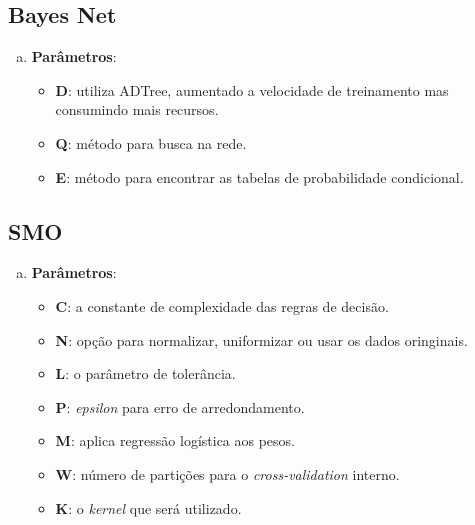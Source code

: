 \subsection{Bayes Net}

\begin{enumerate}[a)]
    \item \textbf{Parâmetros}:
        \begin{itemize}

            \item \textbf{D}: utiliza ADTree, aumentado a velocidade de treinamento mas consumindo mais recursos.

            \item \textbf{Q}: método para busca na rede.

            \item \textbf{E}: método para encontrar as tabelas de probabilidade condicional.
        \end{itemize}
\end{enumerate}

\subsection{SMO}

\begin{enumerate}[a)]
    \item \textbf{Parâmetros}:
        \begin{itemize}

            \item \textbf{C}: a constante de complexidade das regras de decisão.

            \item \textbf{N}: opção para normalizar, uniformizar ou usar os dados oringinais.

            \item \textbf{L}: o parâmetro de tolerância.

            \item \textbf{P}: \emph{epsilon} para erro de arredondamento.

            \item \textbf{M}: aplica regressão logística aos pesos.

            \item \textbf{W}: número de partições para o \emph{cross-validation} interno.

            \item \textbf{K}: o \emph{kernel} que será utilizado.
        \end{itemize}
\end{enumerate}

